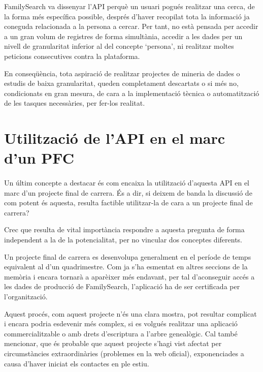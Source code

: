     FamilySearch va dissenyar l'API perquè un usuari pogués realitzar una cerca, de la forma més específica possible, després d'haver recopilat tota la informació ja coneguda relacionada a la persona a cercar. Per tant, no està pensada per accedir a un gran volum de registres de forma simultània, accedir a les dades per un ni\-vell de granularitat inferior al del concepte `persona', ni realitzar moltes peticions consecutives contra la plataforma.

    En conseqüència, tota aspiració de realitzar projectes de mineria de dades o estudis de baixa granularitat, queden completament descartats o si més no, condicionats en gran mesura, de cara a la implementació tècnica o automatització de les tasques necessàries, per fer-los realitat.


\section{Utilització de l'API en el marc d'un PFC}

    \paragraph{}
    Un últim concepte a destacar és com encaixa la utilització d'aquesta API en el marc d'un projecte final de carrera. És a dir, si deixem de banda la discussió de com potent és aquesta, resulta factible utilitzar-la de cara a un projecte final de carrera?

    Crec que resulta de vital importància respondre a aquesta pregunta de forma independent a la de la potencialitat, per no vincular dos conceptes diferents.

    Un projecte final de carrera es desenvolupa generalment en el període de temps equivalent al d'un quadrimestre. Com ja s'ha esmentat en altres seccions de la memòria i encara tornarà a aparèixer més endavant, per tal d'aconseguir accés a les dades de producció de FamilySearch, l'aplicació ha de ser certificada per l'organització.

    Aquest procés, com aquest projecte n'és una clara mostra, pot resultar complicat i encara podria esdevenir més complex, si es volgués realitzar una aplicació commercialitzable o amb drets d'escriptura a l'arbre genealògic. Cal també mencionar, que és probable que aquest projecte s'hagi vist afectat per circumstàncies extraordinàries (problemes en la web oficial), exponenciades a causa d'haver iniciat els contactes en ple estiu.

